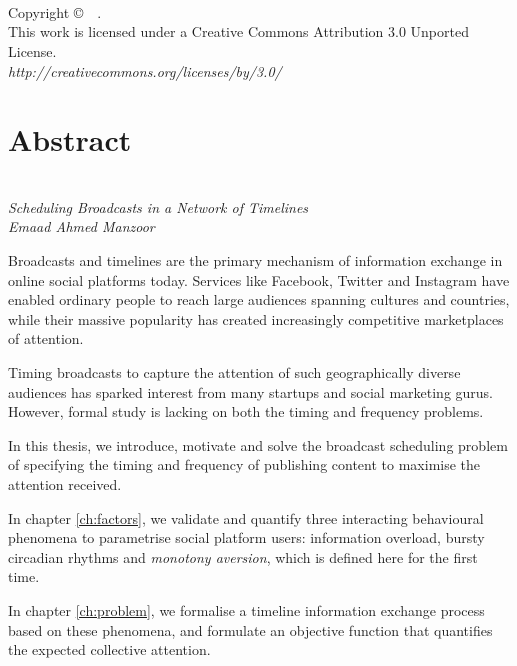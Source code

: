 \documentclass[onesided,asymmetric]{tufte-book}
\begin{document}
\chapter[Copyright]{}
\thispagestyle{fancy}
\begin{fullwidth}
~\vfill

Copyright \copyright\ \the\year\ \thanklessauthor.\\
This work is licensed under a Creative Commons Attribution 3.0 Unported License.\\
\textit{http://creativecommons.org/licenses/by/3.0/}
\end{fullwidth}

\chapter{Abstract}
\\[-2pc]
\textit{Scheduling Broadcasts in a Network of Timelines}\\
\textit{Emaad Ahmed Manzoor}


Broadcasts and timelines are the primary mechanism of information exchange in online social platforms today. Services like Facebook, Twitter and Instagram have enabled ordinary people to reach large audiences spanning cultures and countries, while their massive popularity has created increasingly competitive marketplaces of attention.

Timing broadcasts to capture the attention of such geographically diverse audiences has sparked interest from many startups and social marketing gurus. However, formal study is lacking on both the timing and frequency problems.

In this thesis, we introduce, motivate and solve the broadcast scheduling problem of specifying the timing and frequency of publishing content to maximise the attention received.

In chapter \ref{ch:factors}, we validate and quantify three interacting behavioural phenomena to parametrise social platform users: information overload, bursty circadian rhythms and \textit{monotony aversion}, which is defined here for the first time.

In chapter \ref{ch:problem}, we formalise a timeline information exchange process based on these phenomena, and formulate an objective function that quantifies the expected collective attention.
\end{document}
